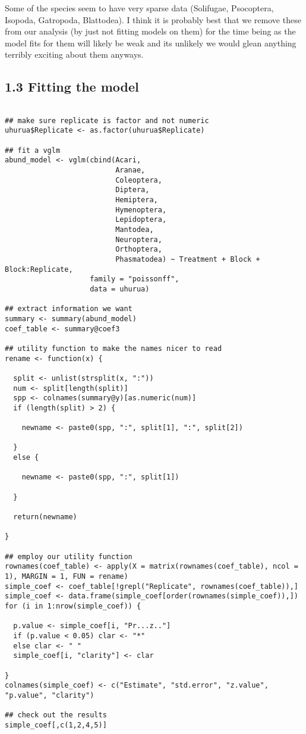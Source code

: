 \documentclass[11pt]{article}
\begin{document}
Some of the species seem to have very sparse data (Solifugae, Psocoptera, Isopoda, Gatropoda, Blattodea). I think it is probably best that we remove these from our analysis (by just not fitting models on them) for the time being as the model fits for them will likely be weak and its unlikely we would glean anything terribly exciting about them anyways.

\subsection*{1.3 Fitting the model}
\label{sec:org71cff1b}

\begin{verbatim}

## make sure replicate is factor and not numeric
uhurua$Replicate <- as.factor(uhurua$Replicate)

## fit a vglm
abund_model <- vglm(cbind(Acari,
                          Aranae,
                          Coleoptera,
                          Diptera,
                          Hemiptera,
                          Hymenoptera,
                          Lepidoptera,
                          Mantodea,
                          Neuroptera,
                          Orthoptera,
                          Phasmatodea) ~ Treatment + Block + Block:Replicate,
                    family = "poissonff",
                    data = uhurua)

## extract information we want
summary <- summary(abund_model)
coef_table <- summary@coef3

## utility function to make the names nicer to read
rename <- function(x) {

  split <- unlist(strsplit(x, ":"))
  num <- split[length(split)]
  spp <- colnames(summary@y)[as.numeric(num)]
  if (length(split) > 2) {

    newname <- paste0(spp, ":", split[1], ":", split[2])

  }
  else {

    newname <- paste0(spp, ":", split[1])

  }

  return(newname)

}

## employ our utility function
rownames(coef_table) <- apply(X = matrix(rownames(coef_table), ncol = 1), MARGIN = 1, FUN = rename)
simple_coef <- coef_table[!grepl("Replicate", rownames(coef_table)),]
simple_coef <- data.frame(simple_coef[order(rownames(simple_coef)),])
for (i in 1:nrow(simple_coef)) {

  p.value <- simple_coef[i, "Pr...z.."]
  if (p.value < 0.05) clar <- "*"
  else clar <- " "
  simple_coef[i, "clarity"] <- clar

}
colnames(simple_coef) <- c("Estimate", "std.error", "z.value", "p.value", "clarity")

## check out the results
simple_coef[,c(1,2,4,5)]

\end{verbatim}
\end{document}
